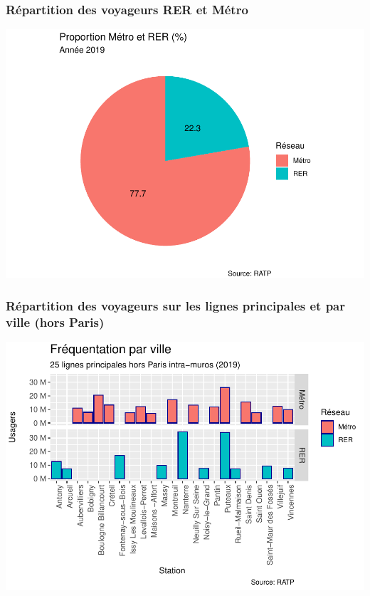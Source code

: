 \documentclass[]{article}
\begin{document}
\hypertarget{ruxe9partition-des-voyageurs-rer-et-muxe9tro}{%
\subsubsection{Répartition des voyageurs RER et
Métro}\label{ruxe9partition-des-voyageurs-rer-et-muxe9tro}}

\includegraphics{Mobilite_RATP_files/figure-latex/unnamed-chunk-7-1.pdf}

\hypertarget{ruxe9partition-des-voyageurs-sur-les-lignes-principales-et-par-ville-hors-paris}{%
\subsubsection{Répartition des voyageurs sur les lignes principales et
par ville (hors
Paris)}\label{ruxe9partition-des-voyageurs-sur-les-lignes-principales-et-par-ville-hors-paris}}

\includegraphics{Mobilite_RATP_files/figure-latex/unnamed-chunk-9-1.pdf}
\end{document}
